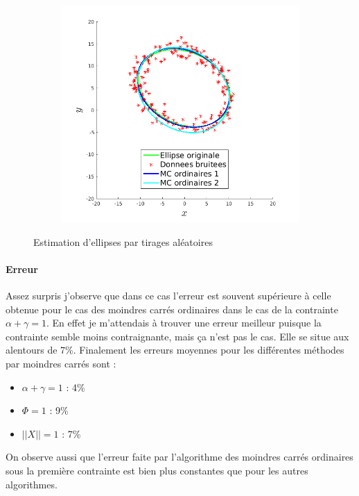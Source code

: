 \documentclass{article}
\begin{document}
\begin{figure}[!ht]
\begin{subfigure}[c]{0.49\linewidth}
        \includegraphics[width=\linewidth]{images/4-mco_2.png}
    \end{subfigure}
    \caption{Estimation d'ellipses par tirages aléatoires}
    \label{3-moindres-carres-ordinaires}
\end{figure}

\paragraph{Erreur}
Assez surpris j'observe que dans ce cas l'erreur est souvent supérieure à celle obtenue pour le cas des moindres carrés ordinaires dans le cas de la contrainte $\alpha + \gamma = 1$. En effet je m'attendais à trouver une erreur meilleur puisque la contrainte semble moins contraignante, mais ça n'est pas le cas. Elle se situe aux alentours de 7\%. Finalement les erreurs moyennes pour les différentes méthodes par moindres carrés sont :
\begin{itemize}
    \item $\alpha + \gamma = 1$ : 4\%
    \item $\Phi = 1$ : 9\%
    \item $||X|| = 1$ : 7\%
\end{itemize}
On observe aussi que l'erreur faite par l'algorithme des moindres carrés ordinaires sous la première contrainte est bien plus constantes que pour les autres algorithmes.
\end{document}
